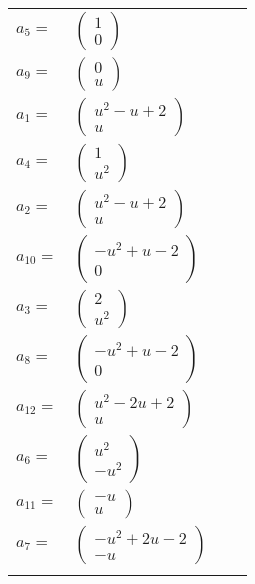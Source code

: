 \documentclass[1p]{elsarticle_modified}
\theoremstyle{definition}
\begin{document}
\begin{tabular}{m{7pt} m{180pt} m{7pt} m{180pt} }
\flushright $a_{5}=$&$\begin{pmatrix}1\\0\end{pmatrix}$ \\
\flushright $a_{9}=$&$\begin{pmatrix}0\\u\end{pmatrix}$ \\
\flushright $a_{1}=$&$\begin{pmatrix}u^2- u+2\\u\end{pmatrix}$ \\
\flushright $a_{4}=$&$\begin{pmatrix}1\\u^2\end{pmatrix}$ \\
\flushright $a_{2}=$&$\begin{pmatrix}u^2- u+2\\u\end{pmatrix}$ \\
\flushright $a_{10}=$&$\begin{pmatrix}- u^2+u-2\\0\end{pmatrix}$ \\
\flushright $a_{3}=$&$\begin{pmatrix}2\\u^2\end{pmatrix}$ \\
\flushright $a_{8}=$&$\begin{pmatrix}- u^2+u-2\\0\end{pmatrix}$ \\
\flushright $a_{12}=$&$\begin{pmatrix}u^2-2 u+2\\u\end{pmatrix}$ \\
\flushright $a_{6}=$&$\begin{pmatrix}u^2\\- u^2\end{pmatrix}$ \\
\flushright $a_{11}=$&$\begin{pmatrix}- u\\u\end{pmatrix}$ \\
\flushright $a_{7}=$&$\begin{pmatrix}- u^2+2 u-2\\- u\end{pmatrix}$\\&\end{tabular}
\end{document}
